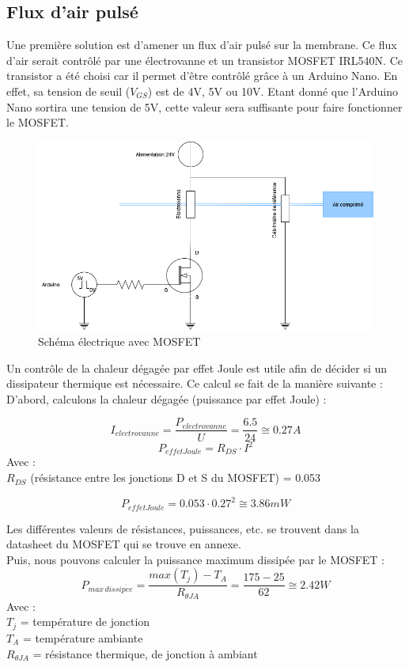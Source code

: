 \subsection{Flux d'air pulsé}
Une première solution est d'amener un flux d'air pulsé sur la membrane. Ce flux d'air serait contrôlé par une électrovanne et un
transistor MOSFET IRL540N. Ce transistor a été choisi car il permet d'être contrôlé grâce à un Arduino Nano. En effet, sa tension de seuil
($V_{GS}$) est de 4V, 5V ou 10V. Etant donné que l'Arduino Nano sortira une tension de 5V, cette valeur sera suffisante pour faire fonctionner
le MOSFET.
\begin{figure}[H]
    \centering
    \includegraphics[scale=0.6]{assets/figures/MOSFET.png}
    \caption{Schéma électrique avec MOSFET}
    \label{fig:MOSFET}
\end{figure}
Un contrôle de la chaleur dégagée par effet Joule est utile afin de décider si un dissipateur thermique est nécessaire. Ce calcul se fait
de la manière suivante :\\
D'abord, calculons la chaleur dégagée (puissance par effet Joule) :

\[I_{electrovanne} = \frac{P_{electrovanne}}{U} = \frac{6.5}{24} \cong 0.27 A \]
\[P_{effetJoule} = R_{DS}\cdot I^2\]
Avec :\\
$R_{DS}$ (résistance entre les jonctions D et S du MOSFET) = 0.053

\begin{equation}
    P_{effetJoule} = 0.053\cdot 0.27^2 \cong 3.86mW
\end{equation}

Les différentes valeurs de résistances, puissances, etc. se trouvent dans la datasheet du MOSFET qui se trouve en annexe. \\

Puis, nous pouvons calculer la puissance maximum dissipée par le MOSFET :
\[P_{max\,dissip\acute{e}e} = \frac{max(T_j) - T_A}{R_{\theta JA}} = \frac{175-25}{62}\cong 2.42 W\]
Avec :\\
$T_j$ = température de jonction\\
$T_A$ = température ambiante\\
$R_{\theta JA}$ = résistance thermique, de jonction à ambiant

